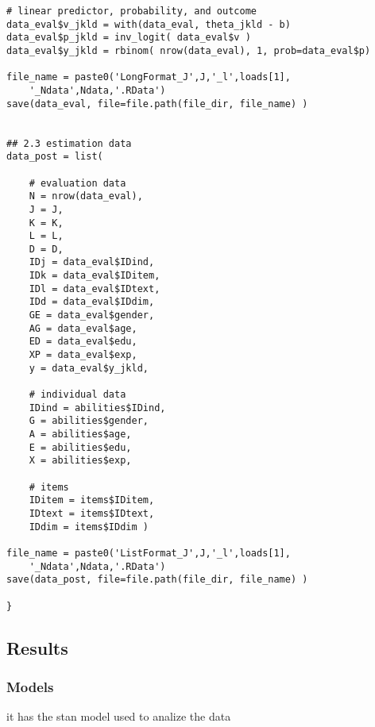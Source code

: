 \begin{lstlisting}
# linear predictor, probability, and outcome
data_eval$v_jkld = with(data_eval, theta_jkld - b)
data_eval$p_jkld = inv_logit( data_eval$v )
data_eval$y_jkld = rbinom( nrow(data_eval), 1, prob=data_eval$p)
		
file_name = paste0('LongFormat_J',J,'_l',loads[1],
	'_Ndata',Ndata,'.RData')
save(data_eval, file=file.path(file_dir, file_name) )
		
	
## 2.3 estimation data
data_post = list(
		
	# evaluation data
	N = nrow(data_eval),
	J = J,
	K = K,
	L = L,
	D = D,
	IDj = data_eval$IDind,
	IDk = data_eval$IDitem,
	IDl = data_eval$IDtext,
	IDd = data_eval$IDdim,
	GE = data_eval$gender,
	AG = data_eval$age,
	ED = data_eval$edu,
	XP = data_eval$exp,
	y = data_eval$y_jkld,
		
	# individual data
	IDind = abilities$IDind,
	G = abilities$gender,
	A = abilities$age,
	E = abilities$edu,
	X = abilities$exp,
		
	# items
	IDitem = items$IDitem,
	IDtext = items$IDtext,
	IDdim = items$IDdim )
		
file_name = paste0('ListFormat_J',J,'_l',loads[1],
	'_Ndata',Ndata,'.RData')
save(data_post, file=file.path(file_dir, file_name) )
		
}
\end{lstlisting}






\subsection{Results} \label{appC2_2:results}

\subsubsection{Models}

it has the stan model used to analize the data \\

